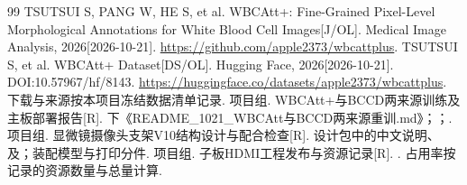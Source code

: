 \begin{thebibliography}{99}
 TSUTSUI S, PANG W, HE S, et al. WBCAtt+: Fine-Grained Pixel-Level Morphological Annotations for White Blood Cell Images[J/OL]. Medical Image Analysis, 2026[2026-10-21]. \url{https://github.com/apple2373/wbcattplus}.
 TSUTSUI S, et al. WBCAtt+ Dataset[DS/OL]. Hugging Face, 2026[2026-10-21]. DOI:10.57967/hf/8143. \url{https://huggingface.co/datasets/apple2373/wbcattplus}. 下载与来源按本项目冻结数据清单记录.
 项目组. WBCAtt+与BCCD两来源训练及主板部署报告[R]. 下《README\_1021\_WBCAtt与BCCD两来源重训.md》；；.
 项目组. 显微镜摄像头支架V10结构设计与配合检查[R]. 设计包中的中文说明、及；装配模型与打印分件.
 项目组. 子板HDMI工程发布与资源记录[R]. . 占用率按记录的资源数量与总量计算.
\end{thebibliography}

